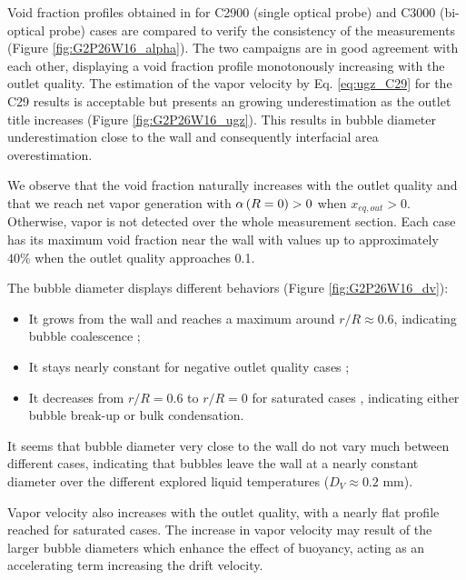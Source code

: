 Void fraction profiles obtained in for C2900 (single optical probe) and C3000 (bi-optical probe) cases are compared to verify the consistency of the measurements (Figure \ref{fig:G2P26W16_alpha}). The two campaigns are in good agreement with each other, displaying a void fraction profile monotonously increasing with the outlet quality. The estimation of the vapor velocity by Eq. \ref{eq:ugz_C29} for the C29 results is acceptable but presents an growing underestimation as the outlet title increases (Figure \ref{fig:G2P26W16_ugz}). This results in bubble diameter underestimation close to the wall and consequently interfacial area overestimation. 

\npar

We observe that the void fraction naturally increases with the outlet quality and that we reach net vapor generation with $\alpha\left( R=0 \right) > 0$ when $x_{eq,out}>0$. Otherwise, vapor is not detected over the whole measurement section. Each case has its maximum void fraction near the wall with values up to approximately $40\%$ when the outlet quality approaches 0.1.

\npar

The bubble diameter displays different behaviors (Figure \ref{fig:G2P26W16_dv}): 

\begin{itemize}
\item It grows from the wall and reaches a maximum around $r/R \approx 0.6$, indicating bubble coalescence ;
\item It stays nearly constant for negative outlet quality cases ;
\item It decreases from $r/R = 0.6$ to $r/R = 0$ for saturated cases , indicating either bubble break-up or bulk condensation.
\end{itemize}

\begin{remark*}{}
It seems that bubble diameter very close to the wall do not vary much between different cases, indicating that bubbles leave the wall at a nearly constant diameter over the different explored liquid temperatures ($D_{V} \approx 0.2$ mm).
\end{remark*}

\npar

Vapor velocity also increases with the outlet quality, with a nearly flat profile reached for saturated cases. The increase in vapor velocity may result of the larger bubble diameters which enhance the effect of buoyancy, acting as an accelerating term increasing the drift velocity.

